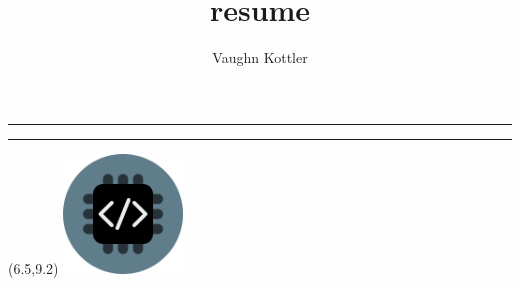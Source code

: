 \documentclass[letterpaper,10pt]{article}
\title{resume}
\author{Vaughn Kottler}
\newcommand{\HR}{{\centering\noindent\rule{7.75in}{0.5pt}}\break}
\begin{document}
%
\noindent
\noindent
\noindent
\HR

\noindent
\noindent
\noindent
\HR
%
\begin{textblock}{1.25}(6.5,9.2)
\includegraphics[width=1.25in,natwidth=100,natheight=100]{im/logo_circle_512.png}
\end{textblock}
\noindent

\end{document}
